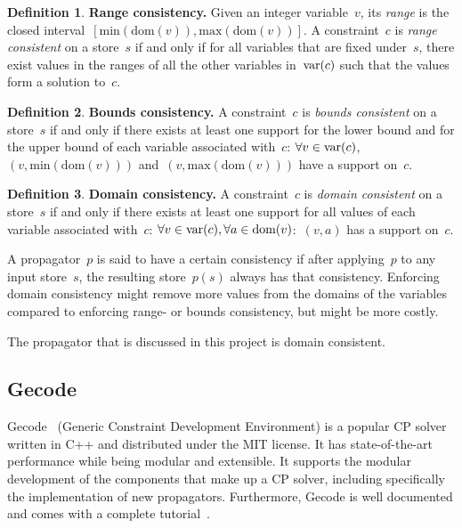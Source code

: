 \documentclass[a4paper,11pt]{article}
\theoremstyle{definition}
\newtheorem{definition}{Definition}
\newcommand{\Dom}[1]{\text{dom}({#1})}
\numberwithin{equation}{section}
\begin{document}
\begin{definition}
  \textbf{Range consistency.}
  Given an integer variable~$v$, its \emph{range} is the closed
  interval~$[\text{min}(\Dom{v}),\text{max}(\Dom{v})]$.
  A constraint~$c$ is \emph{range consistent} on a store~$s$
  if and only if for all variables that are fixed under~$s$,
  there exist values in the ranges of all the other variables
  in~$\text{var}(c)$ such that the values form a solution to~$c$.
\end{definition}

\begin{definition}
  \textbf{Bounds consistency.} A constraint~$c$ is \emph{bounds consistent} on a store~$s$
  if and only if there exists at least one support for the lower bound
  and for the upper bound of each variable associated
  with~$c$: $\forall v \in \text{var}(c)$,~$(v,\text{min}(\Dom{v}))$
  and~$(v,\text{max}(\Dom{v}))$
  have a support on~$c$.
\end{definition}

\begin{definition}
  \textbf{Domain consistency.} A constraint~$c$ is \emph{domain consistent}
  on a store~$s$  if and only if there exists at least one support for all
  values of each variable associated with~$c$:
  $\forall v \in \Variables{c}, \forall a \in \Dom{v}$:~$(v,a)$
  has a support on~$c$.
\end{definition}



A propagator~$p$ is said to have a certain consistency
if after applying~$p$ to any input store~$s$, the resulting store~$p(s)$
always has that consistency.
Enforcing domain consistency might remove more values from the domains of the variables
compared to enforcing range- or bounds consistency, but might be more costly.

The propagator that is discussed in this project is domain consistent.

\subsection{Gecode}
\label{bg:gecode}
Gecode~\cite{Gecode} (Generic Constraint Development Environment)
is a popular CP solver written in C++ and
distributed under the MIT license.
It has state-of-the-art performance while being modular and extensible.
It supports the modular development of the components that make up a
CP solver, including specifically the implementation of new propagators.
Furthermore, Gecode is well documented and comes
with a complete tutorial~\cite{Gecode:MPG}.
\end{document}
